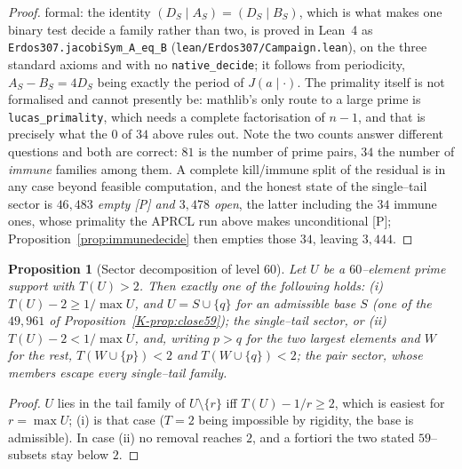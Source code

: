 \documentclass[11pt]{article}
\newtheorem{proposition}[theorem]{Proposition}
\theoremstyle{definition}
\begin{document}
\begin{proof}
formal: the identity $(D_S\mid A_S)=(D_S\mid B_S)$, which is what makes one binary test decide a
family rather than two, is proved in Lean~4 as \texttt{Erdos307.jacobiSym\_A\_eq\_B}
\textup{(\texttt{lean/Erdos307/Campaign.lean})}, on the three standard axioms and with no
\texttt{native\_decide}; it follows from periodicity, $A_S-B_S=4D_S$ being exactly the period of
$J(a\mid\cdot)$. The primality itself is not formalised and cannot presently be: mathlib's only
route to a large prime is \texttt{lucas\_primality}, which needs a complete factorisation of
$n-1$, and that is precisely what the $0$ of $34$ above rules out. Note the two counts answer different questions and both are correct: $81$ is the
number of prime pairs, $34$ the number of \emph{immune} families among them. A complete kill/immune split of the residual is in any case beyond feasible
computation, and the honest state of the single--tail sector is \emph{$46{,}483$ empty
\textup{[P]} and $3{,}478$ open}, the latter including the $34$ immune ones, whose primality the
\textup{APRCL} run above makes unconditional \textup{[P]}; Proposition~\ref{prop:immunedecide} then
empties those $34$, leaving $3{,}444$.
\end{proof}

\begin{proposition}[Sector decomposition of level $60$]\label{prop:sectors}
Let $U$ be a $60$--element prime support with $T(U)>2$. Then exactly one of the following holds:
\textup{(i)} $T(U)-2\ge 1/\max U$, and $U=S\cup\{q\}$ for an admissible base $S$
\textup{(}one of the $49{,}961$ of Proposition~\ref{K-prop:close59}\textup{)}; the
\emph{single--tail sector}, or \textup{(ii)} $T(U)-2<1/\max U$, and, writing $p>q$ for the two
largest elements and $W$ for the rest, $T(W\cup\{p\})<2$ and $T(W\cup\{q\})<2$; the
\emph{pair sector}, whose members escape every single--tail family.
\end{proposition}
\begin{proof}
$U$ lies in the tail family of $U\setminus\{r\}$ iff $T(U)-1/r\ge2$, which is easiest for
$r=\max U$; (i) is that case ($T=2$ being impossible by rigidity, the base is admissible). In
case (ii) no removal reaches $2$, and a fortiori the two stated $59$--subsets stay below $2$.
\end{proof}
\end{document}
